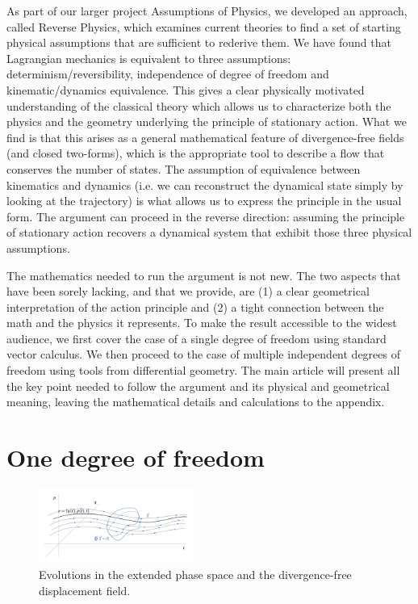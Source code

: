 \documentclass[10pt,twocolumn, nofootinbib]{revtex4-2}
\begin{document}
As part of our larger project Assumptions of Physics, we developed an approach, called Reverse Physics, which examines current theories to find a set of starting physical assumptions that are sufficient to rederive them. We have found that Lagrangian mechanics is equivalent to three assumptions: determinism/reversibility, independence of degree of freedom and kinematic/dynamics equivalence. This gives a clear physically motivated understanding of the classical theory which allows us to characterize both the physics and the geometry underlying the principle of stationary action. What we find is that this arises as a general mathematical feature of divergence-free fields (and closed two-forms), which is the appropriate tool to describe a flow that conserves the number of states. The assumption of equivalence between kinematics and dynamics (i.e. we can reconstruct the dynamical state simply by looking at the trajectory) is what allows us to express the principle in the usual form. The argument can proceed in the reverse direction: assuming the principle of stationary action recovers a dynamical system that exhibit those three physical assumptions.

The mathematics needed to run the argument is not new\cite{souriau1997structure}. The two aspects that have been sorely lacking, and that we provide, are (1) a clear geometrical interpretation of the action principle and (2) a tight connection between the math and the physics it represents. To make the result accessible to the widest audience, we first cover the case of a single degree of freedom using standard vector calculus. We then proceed to the case of multiple independent degrees of freedom using tools from differential geometry. The main article will present all the key point needed to follow the argument and its physical and geometrical meaning, leaving the mathematical details and calculations to the appendix.

\section{One degree of freedom}

\begin{figure}
	\includegraphics[width = 0.45\textwidth]{ExtendedPhaseSpace}
	\caption{\footnotesize{Evolutions in the extended phase space and the divergence-free displacement field.}}\label{extended_phase_space}
\end{figure}
\end{document}
